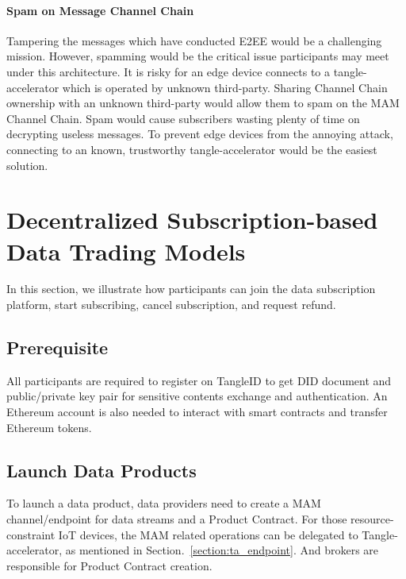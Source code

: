 \documentclass[conference]{IEEEtran}
\begin{document}
\paragraph{Spam on Message Channel Chain}
Tampering the messages which have conducted E2EE would be a challenging mission. However, spamming would be the critical issue participants may meet under this architecture. It is risky for an edge device connects to a tangle-accelerator which is operated by unknown third-party. Sharing Channel Chain ownership with an unknown third-party would allow them to spam on the MAM Channel Chain. Spam would cause subscribers wasting plenty of time on decrypting useless messages. To prevent edge devices from the annoying attack, connecting to an known, trustworthy tangle-accelerator would be the easiest solution.

\section{Decentralized Subscription-based Data Trading Models}
\label{section:trading_model}
In this section, we illustrate how participants can join the data subscription platform, start subscribing, cancel subscription, and request refund.

\subsection{Prerequisite}
All participants are required to register on TangleID to get DID document and public/private key pair for sensitive contents exchange and authentication. An Ethereum account is also needed to interact with smart contracts and transfer Ethereum tokens.

\subsection{Launch Data Products}
\label{section:launch_data_product}
To launch a data product, data providers need to create a MAM channel/endpoint for data streams and a Product Contract. For those resource-constraint IoT devices, the MAM related operations can be delegated to Tangle-accelerator, as mentioned in Section.~\ref{section:ta_endpoint}. And brokers are responsible for Product Contract creation. 
\end{document}
